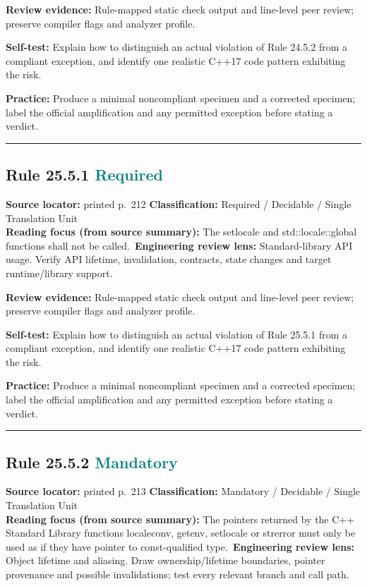 \documentclass[10pt,letterpaper]{article}
\begin{document}
\textbf{Review evidence:} Rule-mapped static check output and line-level peer review; preserve compiler flags and analyzer profile.

\textbf{Self-test:} Explain how to distinguish an actual violation of Rule 24.5.2 from a compliant exception, and identify one realistic C++17 code pattern exhibiting the risk.\par
\textbf{Practice:} Produce a minimal noncompliant specimen and a corrected specimen; label the official amplification and any permitted exception before stating a verdict.
\smallskip\hrule\smallskip
\subsection*{Rule 25.5.1 \enspace \texorpdfstring{\small\textcolor{teal}{Required}}{Required}}
\noindent\textbf{Source locator:} printed p.~212 \quad\textbf{Classification:} Required / Decidable / Single Translation Unit\\
\textbf{Reading focus (from source summary):} The setlocale and std::locale::global functions shall not be called.\
\textbf{Engineering review lens:} Standard-library API usage. Verify API lifetime, invalidation, contracts, state changes and target runtime/library support.

\textbf{Review evidence:} Rule-mapped static check output and line-level peer review; preserve compiler flags and analyzer profile.

\textbf{Self-test:} Explain how to distinguish an actual violation of Rule 25.5.1 from a compliant exception, and identify one realistic C++17 code pattern exhibiting the risk.\par
\textbf{Practice:} Produce a minimal noncompliant specimen and a corrected specimen; label the official amplification and any permitted exception before stating a verdict.
\smallskip\hrule\smallskip
\subsection*{Rule 25.5.2 \enspace \texorpdfstring{\small\textcolor{teal}{Mandatory}}{Mandatory}}
\noindent\textbf{Source locator:} printed p.~213 \quad\textbf{Classification:} Mandatory / Decidable / Single Translation Unit\\
\textbf{Reading focus (from source summary):} The pointers returned by the C++ Standard Library functions localeconv, getenv, setlocale or strerror must only be used as if they have pointer to const-qualified type.\
\textbf{Engineering review lens:} Object lifetime and aliasing. Draw ownership/lifetime boundaries, pointer provenance and possible invalidations; test every relevant branch and call path.
\end{document}
